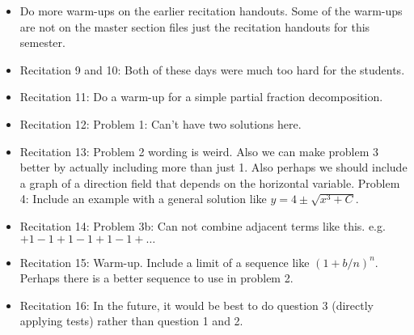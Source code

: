 \documentclass{article}
\begin{document}
\large

\begin{itemize}
\item Do more warm-ups on the earlier recitation handouts. Some of the warm-ups are not on the master section files just the recitation handouts for this semester. 
\item Recitation 9 and 10: Both of these days were much too hard for the students. 
\item Recitation 11: Do a warm-up for a simple partial fraction decomposition.
\item Recitation 12: Problem 1: Can't have two solutions here.
\item Recitation 13: Problem 2 wording is weird. Also we can make problem 3 better by actually including more than just 1. Also perhaps we should include a graph of a direction field that depends on the horizontal variable. Problem 4: Include an example with a general solution like $y=4\pm \sqrt{x^3+C}$. 
\item Recitation 14: Problem 3b: Can not combine adjacent terms like this. e.g. $+1-1+1-1+1-1+\ldots$
\item Recitation 15: Warm-up. Include a limit of a sequence like $(1+b/n)^n$. Perhaps there is a better sequence to use in problem 2.
\item Recitation 16: In the future, it would be best to do question 3 (directly applying tests) rather than question 1 and 2. 
\end{itemize}
\end{document}
